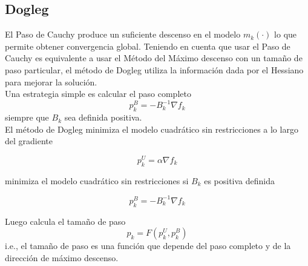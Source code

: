 \documentclass[11pt,letterpaper]{article}
\theoremstyle{definition}
\theoremstyle{definition}
\theoremstyle{definition}
\begin{document}
\subsection{Dogleg}
El Paso de Cauchy produce un suficiente descenso en el modelo $ m_k(\cdot) $ lo que permite obtener convergencia global.
Teniendo en cuenta que usar
el Paso de Cauchy es equivalente a usar el Método del Máximo descenso con un tamaño de paso particular, el método de Dogleg utiliza la información dada por el Hessiano para mejorar la solución.
\\
Una estrategia simple es calcular el paso completo
\[ p_k^B = - B_k^{-1} \nabla f_k \]
siempre que $ B_k $ sea definida positiva. 
\\
El método de Dogleg minimiza el modelo cuadrático sin restricciones a lo largo del gradiente 
\begin{shaded*}
	\[ p_k^U = \alpha \nabla f_k \]
\end{shaded*}
minimiza el modelo cuadrático sin restricciones si $ B_k $ es positiva definida
\begin{shaded*}
	\[ p_k^B = -B_k^{-1} \nabla f_k \]
\end{shaded*}
Luego calcula el tamaño de paso
\[ p_k = F(p_k^U, p_k^B) \]
i.e., el tamaño de paso es una función que depende del paso completo y de la dirección de máximo descenso.
\end{document}

